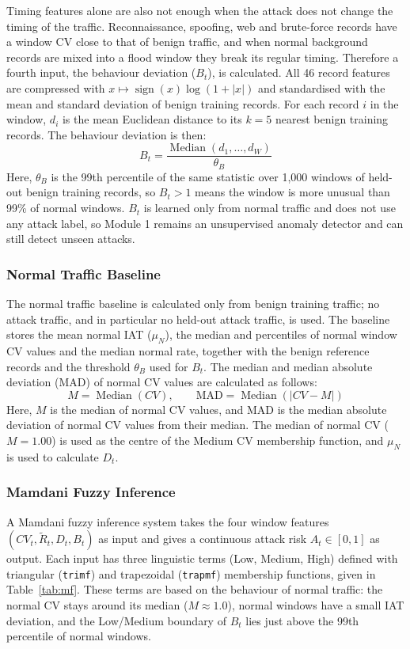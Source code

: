 \documentclass[]{interact}
\theoremstyle{plain}%
\theoremstyle{definition}
\theoremstyle{remark}
\begin{document}
Timing features alone are also not enough when the attack does not change the timing of the traffic. Reconnaissance, spoofing, web and brute-force records have a window CV close to that of benign traffic, and when normal background records are mixed into a flood window they break its regular timing. Therefore a fourth input, the behaviour deviation ($B_t$), is calculated. All 46 record features are compressed with $x \mapsto \operatorname{sign}(x)\log(1+|x|)$ and standardised with the mean and standard deviation of benign training records. For each record $i$ in the window, $d_i$ is the mean Euclidean distance to its $k=5$ nearest benign training records. The behaviour deviation is then:
\begin{equation}
  B_t = \frac{\operatorname{Median}\left(d_1, \ldots, d_W\right)}{\theta_B}
\end{equation}
Here, $\theta_B$ is the 99th percentile of the same statistic over 1,000 windows of held-out benign training records, so $B_t > 1$ means the window is more unusual than 99\% of normal windows. $B_t$ is learned only from normal traffic and does not use any attack label, so Module 1 remains an unsupervised anomaly detector and can still detect unseen attacks.

\subsubsection{Normal Traffic Baseline}
The normal traffic baseline is calculated only from benign training traffic; no attack traffic, and in particular no held-out attack traffic, is used. The baseline stores the mean normal IAT ($\mu_N$), the median and percentiles of normal window CV values and the median normal rate, together with the benign reference records and the threshold $\theta_B$ used for $B_t$. The median and median absolute deviation (MAD) of normal CV values are calculated as follows:
\begin{equation}
  M = \operatorname{Median}(CV), \qquad
  \mathrm{MAD} = \operatorname{Median}\left(\left|CV - M\right|\right)
\end{equation}
Here, $M$ is the median of normal CV values, and $\mathrm{MAD}$ is the median absolute deviation of normal CV values from their median. The median of normal CV ($M = 1.00$) is used as the centre of the Medium CV membership function, and $\mu_N$ is used to calculate $D_t$.

\subsubsection{Mamdani Fuzzy Inference}
A Mamdani fuzzy inference system takes the four window features $(CV_t, \tilde{R}_t, D_t, B_t)$ as input and gives a continuous attack risk $A_t \in [0,1]$ as output. Each input has three linguistic terms (Low, Medium, High) defined with triangular (\texttt{trimf}) and trapezoidal (\texttt{trapmf}) membership functions, given in Table~\ref{tab:mf}. These terms are based on the behaviour of normal traffic: the normal CV stays around its median ($M \approx 1.0$), normal windows have a small IAT deviation, and the Low/Medium boundary of $B_t$ lies just above the 99th percentile of normal windows.
\end{document}
